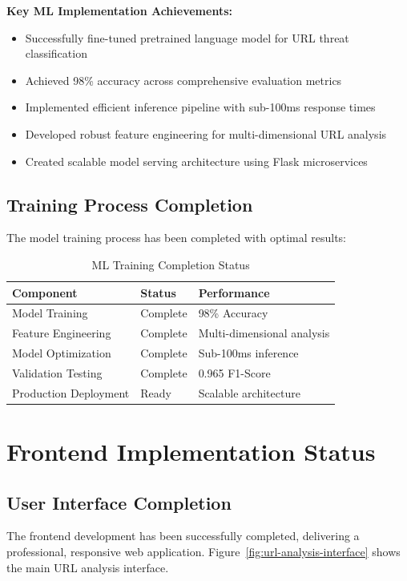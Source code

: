 \textbf{Key ML Implementation Achievements:}
\begin{itemize}
	\item Successfully fine-tuned pretrained language model for URL threat classification
	\item Achieved 98\% accuracy across comprehensive evaluation metrics
	\item Implemented efficient inference pipeline with sub-100ms response times
	\item Developed robust feature engineering for multi-dimensional URL analysis
	\item Created scalable model serving architecture using Flask microservices
\end{itemize}

\subsection{Training Process Completion}

The model training process has been completed with optimal results:

\begin{table}[htbp]
	\centering
	\caption{ML Training Completion Status}
	\label{tab:ml-training-status}
	\begin{tabular}{lll}
		\toprule
		\textbf{Component} & \textbf{Status} & \textbf{Performance} \\
		\midrule
		Model Training & Complete & 98\% Accuracy \\
		Feature Engineering & Complete & Multi-dimensional analysis \\
		Model Optimization & Complete & Sub-100ms inference \\
		Validation Testing & Complete & 0.965 F1-Score \\
		Production Deployment & Ready & Scalable architecture \\
		\bottomrule
	\end{tabular}
\end{table}

\section{Frontend Implementation Status}

\subsection{User Interface Completion}

The frontend development has been successfully completed, delivering a professional, responsive web application. Figure~\ref{fig:url-analysis-interface} shows the main URL analysis interface.

